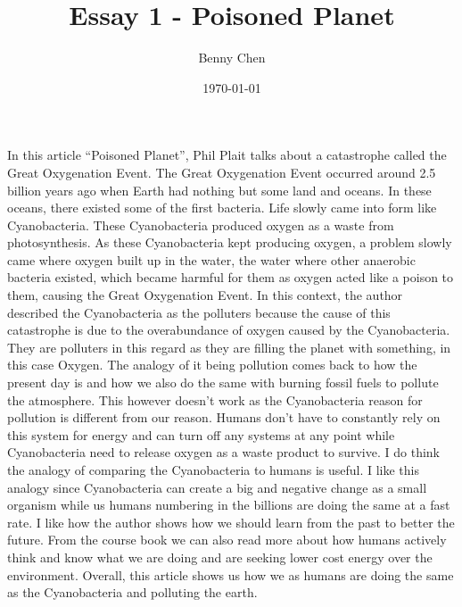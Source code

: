 \documentclass{article}
\title{Essay 1 - Poisoned Planet}
\author{Benny Chen}
\date{\today}
\begin{document}
\maketitle

In this article “Poisoned Planet”, Phil Plait talks about a catastrophe called the Great Oxygenation Event. The Great Oxygenation Event occurred around 2.5 billion years ago when Earth had nothing but some land and oceans. In these oceans, there existed some of the first bacteria. Life slowly came into form like Cyanobacteria. These Cyanobacteria produced oxygen as a waste from photosynthesis. As these Cyanobacteria kept producing oxygen, a problem slowly came where oxygen built up in the water, the water where other anaerobic bacteria existed, which became harmful for them as oxygen acted like a poison to them, causing the Great Oxygenation Event. In this context, the author described the Cyanobacteria as the polluters because the cause of this catastrophe is due to the overabundance of oxygen caused by the Cyanobacteria. They are polluters in this regard as they are filling the planet with something, in this case Oxygen. The analogy of it being pollution comes back to how the present day is and how we also do the same with burning fossil fuels to pollute the atmosphere. This however doesn’t work as the Cyanobacteria reason for pollution is different from our reason. Humans don’t have to constantly rely on this system for energy and can turn off any systems at any point while Cyanobacteria need to release oxygen as a waste product to survive. I do think the analogy of comparing the Cyanobacteria to humans is useful. I like this analogy since Cyanobacteria can create a big and negative change as a small organism while us humans numbering in the billions are doing the same at a fast rate. I like how the author shows how we should learn from the past to better the future. From the course book we can also read more about how humans actively think and know what we are doing and are seeking lower cost energy over the environment. Overall, this article shows us how we as humans are doing the same as the Cyanobacteria and polluting the earth.
\end{document}
